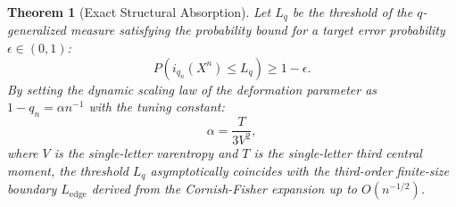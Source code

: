 \documentclass[conference]{IEEEtran}
\begin{document}
\newtheorem{theorem}{Theorem}
\begin{theorem}[Exact Structural Absorption]
\label{thm:absorption}
Let $L_q$ be the threshold of the $q$-generalized measure satisfying the probability bound for a target error probability $\epsilon \in (0, 1)$:
\begin{equation}
    P\left( i_{q_n}(X^n) \le L_q \right) \ge 1-\epsilon.
\label{eq:q_fluctuation_bound}
\end{equation}
By setting the dynamic scaling law of the deformation parameter as $1-q_n = \alpha n^{-1}$ with the tuning constant:
\begin{equation}
    \alpha = \frac{T}{3V^2},
\label{eq:alpha_tuning}
\end{equation}
where $V$ is the single-letter varentropy and $T$ is the single-letter third central moment, the threshold $L_q$ asymptotically coincides with the third-order finite-size boundary $L_{\text{edge}}$ derived from the Cornish-Fisher expansion up to $O(n^{-1/2})$.
\end{theorem}
\end{document}
